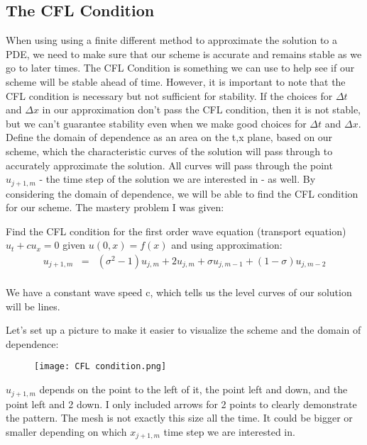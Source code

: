 \documentclass{article}
\newcommand{\bea}{\begin{eqnarray*}}
\newcommand{\eea}{\end{eqnarray*}}
\newcommand{\blue}[1]{\textcolor{blue}{#1}}
\begin{document}
 \subsection{The CFL Condition}
When using using a finite different method to approximate the solution to a PDE, we need to make sure that our scheme is accurate and remains stable as we go to later times. The CFL Condition is something we can use to help see if our scheme will be stable ahead of time. However, it is important to note that the CFL condition is necessary but not sufficient for stability. If the choices for $\Delta t$ and $\Delta x$ in our approximation don't pass the CFL condition, then it is not stable, but we can't guarantee stability even when we make good choices for $\Delta t$ and $\Delta x$. \newline
\newline
Define the domain of dependence as an area on the t,x plane, based on our scheme, which the characteristic curves of the solution will pass through to accurately approximate the solution. All curves will pass through the point $u_{j+1,m}$ - the time step of the solution we are interested in - as well. By considering the domain of dependence, we will be able to find the CFL condition for our scheme.\newline
\newline
The mastery problem I was given: \newline

Find the CFL condition for the first order wave equation (transport equation) $u_t+cu_x = 0$ given $u(0,x)=f(x)$ and using approximation:
\bea
 u_{j+1,m} &=& (\sigma^2-1)u_{j,m} + 2u_{j,m} + \sigma u_{j,m-1} + (1-\sigma)u_{j,m-2}\\
\eea

We have a constant wave speed c, which tells us the level curves of our solution will be lines. \newline 

Let's set up a picture to make it easier to visualize the scheme and the domain of dependence:

\begin{figure}[ht]
\begin{center}
  \texttt{[image: CFL condition.png]}
  \end{center}
\end{figure}
\newpage
$u_{j+1,m}$ depends on the point to the left of it, the point left and down, and the point left and 2 down. I only included arrows for 2 points to clearly demonstrate the pattern. The mesh is not exactly this size all the time. It could be bigger or smaller depending on which $x_{j+1,m}$ time step we are interested in. \newline
\end{document}
